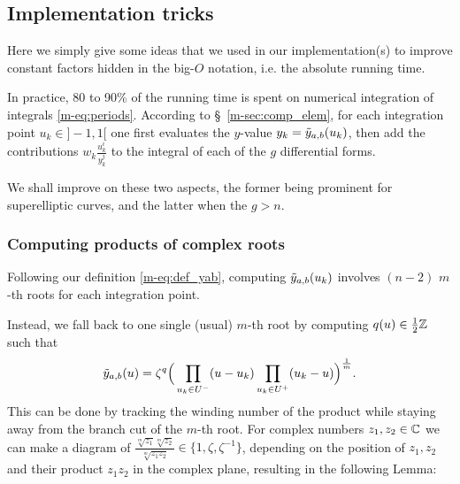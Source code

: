 \documentclass[main.tex]{subfiles}
\begin{document}
   \subsection{Implementation tricks}

   Here we simply give some ideas that we used in our implementation(s) to improve constant factors hidden in the big-$O$ notation, i.e. the absolute running time.

   In practice, 80 to 90\% of the running time is spent on numerical integration
   of integrals \eqref{m-eq:periods}. According to \S~\ref{m-sec:comp_elem},
   for each integration point $u_k\in]-1,1[$ one first evaluates the $y$-value
   $y_k=\tilde{y}_{a,b}(u_k)$, then add the contributions $w_k\frac{u_k^i}{y_k^j}$ to
   the integral of each of the $g$ differential forms.

   We shall improve on these two aspects, the former being prominent for superelliptic curves,
   and the latter when the $g>n$.

    \subsubsection{Computing products of complex roots}\label{subsec:computing_roots}

    Following our definition \eqref{m-eq:def_yab}, computing $\tilde{y}_{a,b}(u_k)$ involves
    $(n-2)$ $m$-th roots for each integration point.

    Instead, we fall back to one single (usual) $m$-th root
    by computing $q(u)\in\frac12\mathbb{Z}$ such that
  \begin{equation*}
      \label{eq:ytab_comp}
   \tilde{y}_{a,b}(u) = \zeta^q \Big( \prod_{u_k\in U^-}(u-u_k) \prod_{u_k\in U^+} (u_k-u) \Big)^{\frac{1}{m}}.
  \end{equation*}
  This can be done by tracking
  the winding number of the product while staying away from the branch cut
  of the $m$-th root.
  For complex numbers $z_1,z_2 \in \mathbb{C}$ we can make a diagram of
  $\frac{\sqrt[m]{z_1}\sqrt[m]{z_2}}{\sqrt[m]{z_1z_2}} \in \{ 1, \zeta,
  \zeta^{-1} \}$, depending on the position of $z_1,z_2$ and their product
  $z_1z_2$ in the complex plane, resulting in the following Lemma:
\end{document}
